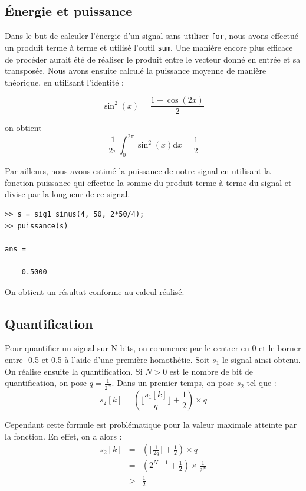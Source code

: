\documentclass[french]{article}
\begin{document}
\subsection{ Énergie et puissance}

Dans le but de calculer l'énergie d'un signal sans utiliser \verb`for`, nous avons effectué un produit terme à terme et utilisé l'outil \verb`sum`. Une manière encore plus efficace de procéder aurait été de réaliser le produit entre le vecteur donné en entrée et sa transposée. Nous avons ensuite calculé la puissance moyenne de manière théorique, en utilisant l'identité :

\begin{equation}
\sin^2(x)=\frac {1-\cos(2x)} {2}
\end{equation}

on obtient
\begin{equation}
\frac{1} {2 \pi} \int_{0}^{2 \pi} \sin^2(x) \mathrm{d}x = \frac{1}{2}
\end{equation}

Par ailleurs, nous avons estimé la puissance de notre signal en utilisant la fonction puissance qui effectue la somme du produit terme à terme du signal et divise par la longueur de ce signal.

\lstset{language=matlab}
\begin{lstlisting}
>> s = sig1_sinus(4, 50, 2*50/4);
>> puissance(s)

ans =

    0.5000
\end{lstlisting}

On obtient un résultat conforme au calcul réalisé.

\subsection{ Quantification}

Pour quantifier un signal sur N bits, on commence par le centrer en 0 et le borner entre -0.5 et 0.5 à l'aide d'une première homothétie. Soit $s_1$ le signal ainsi obtenu. On réalise ensuite la quantification. Si $N > 0$ est le nombre de bit de quantification, on pose $q=\frac{1}{2^N}$. Dans un premier temps, on pose $s_2$ tel que :
\begin{equation}
  s_2[k] = (\lfloor \frac{s_1[k]}{q} \rfloor + \frac{1}{2}) \times q
\end{equation}

Cependant cette formule est problématique pour la valeur maximale atteinte par la fonction. En effet, on a alors :
\begin{eqnarray}
s_2[k] &=& \left( \lfloor \frac{1}{2q} \rfloor + \frac{1}{2}\right) \times q \\
&=& \left(2^{N-1} + \frac{1}{2}\right) \times \frac{1}{2^N} \\
&>& \frac{1}{2}
\end{eqnarray}
\end{document}
